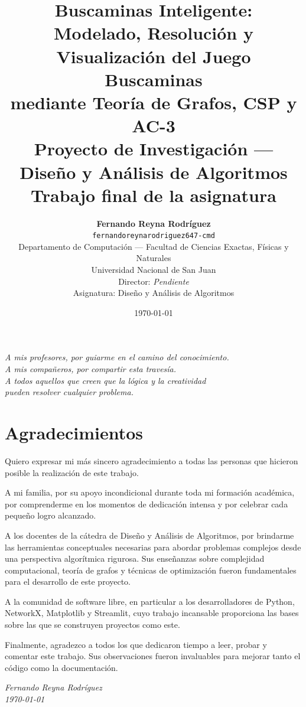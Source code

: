 \documentclass[12pt,a4paper]{article}
\title{
    \vspace{2cm}
    \Huge\textbf{Buscaminas Inteligente:}\\[0.4cm]
    \Large\textbf{Modelado, Resolución y Visualización del Juego Buscaminas}\\[0.2cm]
    \Large\textbf{mediante Teoría de Grafos, CSP y AC-3}\\[1.2cm]
    \normalsize{Proyecto de Investigación --- Diseño y Análisis de Algoritmos}\\[0.3cm]
    \normalsize{Trabajo final de la asignatura}
}
\author{
    \textbf{Fernando Reyna Rodríguez}\\[0.3cm]
    \texttt{fernandoreynarodriguez647-cmd}\\[0.3cm]
    \normalsize{Departamento de Computación --- Facultad de Ciencias Exactas, Físicas y Naturales}\\[0.2cm]
    \normalsize{Universidad Nacional de San Juan}\\[1cm]
    \normalsize{Director: \textit{Pendiente}}\\[0.2cm]
    \normalsize{Asignatura: Diseño y Análisis de Algoritmos}
}
\date{\today}
\begin{document}
\maketitle
\thispagestyle{empty}
\newpage

\thispagestyle{empty}
\vspace*{8cm}
\begin{center}
    \textit{A mis profesores, por guiarme en el camino del conocimiento.}\\[0.3cm]
    \textit{A mis compañeros, por compartir esta travesía.}\\[0.3cm]
    \textit{A todos aquellos que creen que la lógica y la creatividad}\\[0.2cm]
    \textit{pueden resolver cualquier problema.}
\end{center}
\newpage

\thispagestyle{empty}
\section*{Agradecimientos}

Quiero expresar mi más sincero agradecimiento a todas las personas que hicieron posible la realización de este trabajo.

A mi familia, por su apoyo incondicional durante toda mi formación académica, por comprenderme en los momentos de dedicación intensa y por celebrar cada pequeño logro alcanzado.

A los docentes de la cátedra de Diseño y Análisis de Algoritmos, por brindarme las herramientas conceptuales necesarias para abordar problemas complejos desde una perspectiva algorítmica rigurosa. Sus enseñanzas sobre complejidad computacional, teoría de grafos y técnicas de optimización fueron fundamentales para el desarrollo de este proyecto.

A la comunidad de software libre, en particular a los desarrolladores de Python, NetworkX, Matplotlib y Streamlit, cuyo trabajo incansable proporciona las bases sobre las que se construyen proyectos como este.

Finalmente, agradezco a todos los que dedicaron tiempo a leer, probar y comentar este trabajo. Sus observaciones fueron invaluables para mejorar tanto el código como la documentación.

\vspace{1cm}
\begin{flushright}
    \textit{Fernando Reyna Rodríguez}\\
    \textit{\today}
\end{flushright}
\newpage
\end{document}
